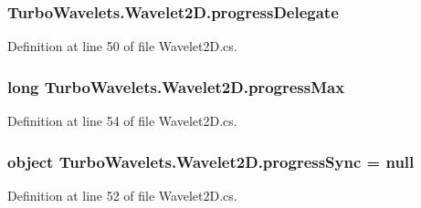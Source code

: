 \hypertarget{class_turbo_wavelets_1_1_wavelet2_d_a41d9135f22a6b2cb661b2cc2ccb768ff}{
\subsubsection[{progress\+Delegate}]{ Turbo\+Wavelets.\+Wavelet2\+D.\+progress\+Delegate\hspace{0.3cm}{\ttfamily [protected]}}}\label{class_turbo_wavelets_1_1_wavelet2_d_a41d9135f22a6b2cb661b2cc2ccb768ff}


Definition at line 50 of file Wavelet2\+D.\+cs.

\hypertarget{class_turbo_wavelets_1_1_wavelet2_d_a7cbf7ce44310a48178f36101a4c03add}{
\subsubsection[{progress\+Max}]{\setlength{\rightskip}{0pt plus 5cm}long Turbo\+Wavelets.\+Wavelet2\+D.\+progress\+Max\hspace{0.3cm}{\ttfamily [protected]}}}\label{class_turbo_wavelets_1_1_wavelet2_d_a7cbf7ce44310a48178f36101a4c03add}


Definition at line 54 of file Wavelet2\+D.\+cs.

\hypertarget{class_turbo_wavelets_1_1_wavelet2_d_a08a8ff6259f0d66913715c00ed6e167b}{
\subsubsection[{progress\+Sync}]{\setlength{\rightskip}{0pt plus 5cm}object Turbo\+Wavelets.\+Wavelet2\+D.\+progress\+Sync = null\hspace{0.3cm}{\ttfamily [protected]}}}\label{class_turbo_wavelets_1_1_wavelet2_d_a08a8ff6259f0d66913715c00ed6e167b}


Definition at line 52 of file Wavelet2\+D.\+cs.

